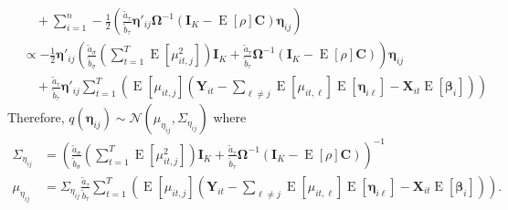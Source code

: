 \documentclass[11pt]{article}
\newcommand{\bs}{\boldsymbol}
\newcommand{\opn}{\operatorname}
\begin{document}
\begin{align*}
  &\quad +\sum_{i=1}^{n}-\frac{1}{2}\left(\frac{\widetilde{a}_{\tau}}{\widetilde{b}_{\tau}}\bs{\eta}'_{ij}\bs{\Omega}^{-1}\left(\mathbf{I}_{K}-\opn{E}\left[\rho\right]\mathbf{C}\right)\bs{\eta}_{ij} \right)\\
  &\propto -\frac{1}{2}\bs{\eta}'_{ij}\left(\frac{\widetilde{a}_{\sigma}}{\widetilde{b}_{\sigma}}\left(\sum_{t=1}^{T}\opn{E}\left[\mu_{it,j}^{2}\right]\right)\mathbf{I}_{K}+\frac{\widetilde{a}_{\tau}}{\widetilde{b}_{\tau}}\bs{\Omega}^{-1}\left(\mathbf{I}_{K}-\opn{E}\left[\rho\right]\mathbf{C}\right)\right)\bs{\eta}_{ij}\\
  &\quad +\frac{\widetilde{a}_{\tau}}{\widetilde{b}_{\tau}}\bs{\eta}'_{ij}\sum_{t=1}^{T}\left(\opn{E}\left[\mu_{it,j}\right]\left(\mathbf{Y}_{it}-\sum_{\ell \neq j}\opn{E}\left[\mu_{it,\ell}\right]\opn{E}\left[\bs{\eta}_{i\ell}\right]-\mathbf{X}_{it}\opn{E}\left[\bs{\beta}_{i}\right]\right)\right)
\end{align*}
Therefore, $q\left(\bs{\eta}_{ij}\right)\sim \mathcal{N}\left(\mu_{\eta_{ij}}, \Sigma_{\eta_{ij}}\right)$ where
\begin{align*}
  \Sigma_{\eta_{ij}} &= \left(\frac{\widetilde{a}_{\sigma}}{\widetilde{b}_{\sigma}}\left(\sum_{t=1}^{T}\opn{E}\left[\mu_{it,j}^{2}\right]\right)\mathbf{I}_{K}+\frac{\widetilde{a}_{\tau}}{\widetilde{b}_{\tau}}\bs{\Omega}^{-1}\left(\mathbf{I}_{K}-\opn{E}\left[\rho\right]\mathbf{C}\right)\right)^{-1}\\
  \mu_{\eta_{ij}} &= \Sigma_{\eta_{ij}}\frac{\widetilde{a}_{\tau}}{\widetilde{b}_{\tau}}\sum_{t=1}^{T}\left(\opn{E}\left[\mu_{it,j}\right]\left(\mathbf{Y}_{it}-\sum_{\ell \neq j}\opn{E}\left[\mu_{it,\ell}\right]\opn{E}\left[\bs{\eta}_{i\ell}\right]-\mathbf{X}_{it}\opn{E}\left[\bs{\beta}_{i}\right]\right)\right).
\end{align*}
\end{document}
